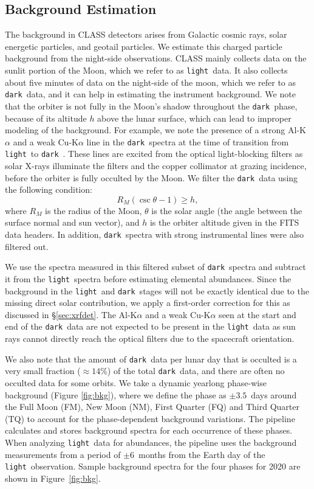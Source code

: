 \documentclass[twocolumn]{aastex631}
\newcommand{\dark}{\texttt{dark}~}
\newcommand{\light}{\texttt{light}~}
\begin{document}
\subsection{Background Estimation}\label{sec:bkgest}
The background in CLASS detectors arises from Galactic cosmic rays, solar energetic particles, and geotail particles. We estimate this charged particle background from the night-side observations. 
CLASS mainly collects data on the sunlit portion of the Moon, which we refer to as \light data. It also collects about five minutes of data on the night-side of the moon, which we refer to as \dark data, and it can help in estimating the instrument background.
We note that the orbiter is not fully in the Moon's shadow throughout the \dark phase, because of its altitude $h$ above the lunar surface, which can lead to improper modeling of the background. For example, we note the presence of a strong Al-K$\alpha$ and a weak Cu-K$\alpha$ line in the \dark spectra at the time of transition from \light to \dark. These lines are excited from the optical light-blocking filters as solar X-rays illuminate the filters and the copper collimator at grazing incidence, before the orbiter is fully occulted by the Moon.
We filter the \dark data using the following condition:
\begin{equation}
R_M (\csc \theta - 1) \geq h ,
\end{equation}
where $R_M$ is the radius of the Moon, $\theta$ is the solar angle (the angle between the surface normal and sun vector), and $h$ is the orbiter altitude given in the FITS data headers. In addition, \dark spectra with strong instrumental lines were also filtered out.

We use the spectra measured in this filtered subset of \dark spectra and subtract it from the \light spectra before estimating elemental abundances. 
Since the background in the \light and \dark stages will not be exactly identical due to the missing direct solar contribution, we apply a first-order correction for this as discussed in \S\ref{sec:xrfdet}. The Al-K$\alpha$ and a weak Cu-K$\alpha$ seen at the start and end of the \dark data are not expected to be present in the \light data as sun rays cannot directly reach the optical filters due to the spacecraft orientation.

We also note that the amount of \dark data per lunar day that is occulted is a very small fraction ($\approx 14\%$) of the total \dark data, and there are often no occulted data for some orbits. We take a dynamic yearlong phase-wise background (Figure \ref{fig:bkg}), where we define the phase as $\pm 3.5$~days around the Full Moon (FM), New Moon (NM), First Quarter (FQ) and Third Quarter (TQ) to account for the phase-dependent background variations. The pipeline calculates and stores background spectra for each occurrence of these phases. When analyzing \light data for abundances, the pipeline uses the background measurements from a period of $\pm 6$~months from the Earth day of the \light observation. Sample background spectra for the four phases for 2020 are shown in Figure~\ref{fig:bkg}.
\end{document}
